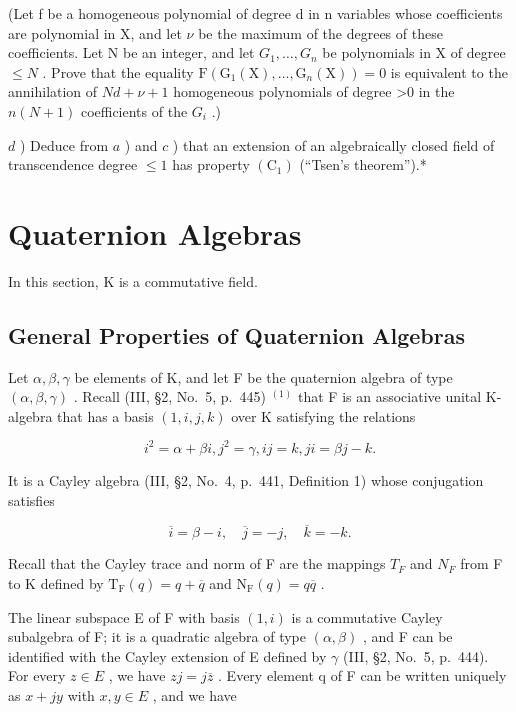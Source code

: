 (Let f be a homogeneous polynomial of degree d in n variables whose coefficients are polynomial in X, and let \(\nu\) be the maximum of the degrees of these coefficients. Let N be an integer, and let \(G_{1},\ldots,G_{n}\) be polynomials in X of degree \(\leqslant N\) . Prove that the equality \(\mathrm{F}(\mathrm{G}_{1}(\mathrm{X}),\ldots,\mathrm{G}_{n}(\mathrm{X}))=0\) is equivalent to the annihilation of \(Nd+\nu+1\) homogeneous polynomials of degree \textgreater0 in the \(n(N+1)\) coefficients of the \(G_{i}\) .)

\(d\) ) Deduce from \(a\) ) and \(c\) ) that an extension of an algebraically closed field of transcendence degree \(\leqslant 1\) has property \((\mathrm{C}_1)\) (``Tsen's theorem'').*

\section{Quaternion Algebras}

In this section, K is a commutative field.

\subsection{General Properties of Quaternion Algebras}

Let \(\alpha, \beta, \gamma\) be elements of K, and let F be the quaternion algebra of type \((\alpha, \beta, \gamma)\) . Recall (III, §2, No.~5, p.~445) \(^{(1)}\) that F is an associative unital K-algebra that has a basis \((1, i, j, k)\) over K satisfying the relations

\[
i ^ {2} = \alpha + \beta i, j ^ {2} = \gamma , i j = k, j i = \beta j - k.\tag{1}
\]

It is a Cayley algebra (III, §2, No.~4, p.~441, Definition 1) whose conjugation satisfies

\[
\overline {{i}} = \beta - i, \quad \overline {{j}} = - j, \quad \overline {{k}} = - k.\tag{2}
\]

Recall that the Cayley trace and norm of F are the mappings \(T_{F}\) and \(N_{F}\) from F to K defined by \(\mathrm{T}_{\mathrm{F}}(q)=q+\overline{q}\) and \(\mathrm{N}_{\mathrm{F}}(q)=q\overline{q}\) .

The linear subspace E of F with basis \((1,i)\) is a commutative Cayley subalgebra of F; it is a quadratic algebra of type \((\alpha,\beta)\) , and F can be identified with the Cayley extension of E defined by \(\gamma\) (III, §2, No.~5, p.~444). For every \(z\in E\) , we have \(zj=j\overline{z}\) . Every element q of F can be written uniquely as \(x+jy\) with \(x,y\in E\) , and we have

